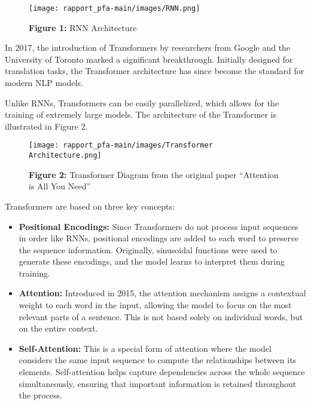 \begin{figure}[htbp]
  \centering
  \texttt{[image: rapport\_pfa-main/images/RNN.png]}
  \caption*{\textbf{Figure 1:} RNN Architecture} %
  \label{fig:indexing-process-manual}
\end{figure}

In 2017, the introduction of Transformers by researchers from Google and the University of Toronto marked a significant breakthrough. Initially designed for translation tasks, the Transformer architecture has since become the standard for modern NLP models.

Unlike RNNs, Transformers can be easily parallelized, which allows for the training of extremely large models. The architecture of the Transformer is illustrated in Figure 2.

\begin{figure}[H]
  \centering
  \texttt{[image: rapport\_pfa-main/images/Transformer Architecture.png]}
  \caption*{\textbf{Figure 2:} Transformer Diagram from the original paper ``Attention is All You Need''} %
  \label{fig:transformer_architecture}
\end{figure}

Transformers are based on three key concepts:

\begin{itemize}
    \item \textbf{Positional Encodings:} Since Transformers do not process input sequences in order like RNNs, positional encodings are added to each word to preserve the sequence information. Originally, sinusoidal functions were used to generate these encodings, and the model learns to interpret them during training.

    \item \textbf{Attention:} Introduced in 2015, the attention mechanism assigns a contextual weight to each word in the input, allowing the model to focus on the most relevant parts of a sentence. This is not based solely on individual words, but on the entire context.

    \item \textbf{Self-Attention:} This is a special form of attention where the model considers the same input sequence to compute the relationships between its elements. Self-attention helps capture dependencies across the whole sequence simultaneously, ensuring that important information is retained throughout the process.
\end{itemize}

